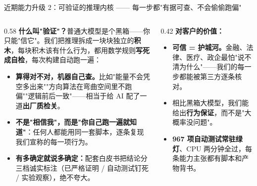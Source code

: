 ﻿\documentclass[aspectratio=169, 10pt]{beamer}
\begin{document}
\begin{frame}{近期能力升级 2：可验证的推理内核 —— 每一步都"有据可查、不会偷偷跑偏"}
\small
\begin{columns}
\begin{column}{0.58\textwidth}
\textbf{什么叫"验证"？}普通大模型是个黑箱——你只能"信它"。我们把推理拆成一块块独立的\textbf{积木}，每块积木该有什么行为，都用数学规则\textbf{写死成自检}，每次构建自动跑一遍：
\begin{itemize}\itemsep=0.3em
    \item \textbf{算得对不对，机器自己查。}比如"能量不会凭空多出来""方向算法在弯曲空间里不跑偏""逻辑前后一致"——相当于给 AI 配了一道\textbf{出厂质检关}。
    \item \textbf{不是"相信我"，而是"你自己跑一遍就知道"}：任何人都能用同一套脚本，逐条复现我们宣称的每一项行为。
    \item \textbf{有多确定就说多确定：}配套白皮书把结论分三档诚实标注（已严格证明 / 自动测试钉死 / 实验观察），绝不夸大。
\end{itemize}
\end{column}
\begin{column}{0.42\textwidth}
\textbf{对客户的价值：}
\begin{itemize}\itemsep=0.3em
    \item \textbf{可信 = 护城河。}金融、法律、医疗、政企最怕"说不清为什么"——我们的每一步都能被第三方逐条核对。
    \item 相比黑箱大模型，我们能给出\textbf{行为保证}，而不是"大概率没问题"。
    \item \textbf{967 项自动测试常驻绿灯}、CPU 两分钟全过，每条能力主张都有脚本和产物背书。
\end{itemize}
\end{column}
\end{columns}
\end{frame}
\end{document}
